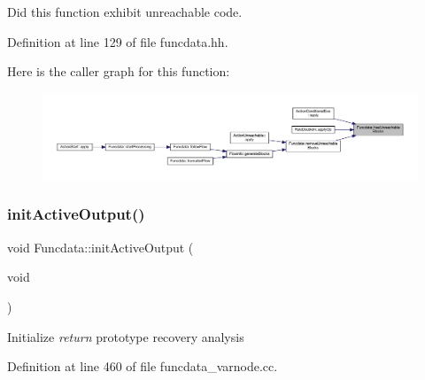 Did this function exhibit unreachable code. 



Definition at line 129 of file funcdata.\+hh.

Here is the caller graph for this function\+:
\nopagebreak
\begin{figure}[H]
\begin{center}
\leavevmode
\includegraphics[width=350pt]{class_funcdata_ae7daf83122a6a2ffff93774466baab26_icgraph}
\end{center}
\end{figure}
\mbox{\label{class_funcdata_ae454fbd3566fbd43103dcabdf2681fd8}} 
\subsubsection{\texorpdfstring{initActiveOutput()}{initActiveOutput()}}
{\footnotesize\ttfamily void Funcdata\+::init\+Active\+Output (\begin{DoxyParamCaption}\item[{void}]{ }\end{DoxyParamCaption})}

Initialize {\itshape return} prototype recovery analysis 

Definition at line 460 of file funcdata\+\_\+varnode.\+cc.

